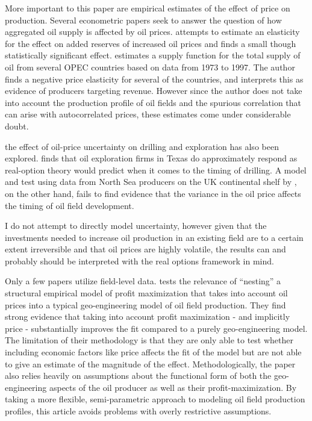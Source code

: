 \documentclass[12pt]{article}
\begin{document}
More important to this paper are empirical estimates of the effect of price on production. Several econometric papers seek to answer the question of how aggregated oil supply is affected by oil prices.  \citet{farzin_impact_2001} attempts to estimate an elasticity for the effect on added reserves of increased oil prices and finds a small though statistically significant effect.  \citet{ramcharran_oil_2002} estimates a supply function for the total supply of oil from several OPEC countries based on data from 1973 to 1997.  The author finds a negative price elasticity for several of the countries, and interprets this as evidence of producers targeting revenue.  However since the author does not take into account the production profile of oil fields and the spurious correlation that can arise with autocorrelated prices, these estimates come under considerable doubt.  

the effect of oil-price uncertainty on drilling and exploration has also been explored.  \citet{kellogg_effect_2014} finds that oil exploration firms in Texas do approximately respond as real-option theory would predict when it comes to the timing of drilling.  A model and test using data from North Sea producers on the UK continental shelf by \citet{hurn_geology_1994}, on the other hand, fails to find evidence that the variance in the oil price affects the timing of oil field development.  

I do not attempt to directly model uncertainty, however given that the investments needed to increase oil production in an existing field are to a certain extent irreversible and that oil prices are highly volatile, the results can and probably should be interpreted with the real options framework in mind.  

Only a few papers utilize field-level data.  \citet{black_is_1998} tests the relevance of “nesting” a structural empirical model of profit maximization that takes into account oil prices into a typical geo-engineering model of oil field production.  They find strong evidence that taking into account profit maximization - and implicitly price - substantially improves the fit compared to a purely geo-engineering model.   The limitation of their methodology is that they are only able to test whether including economic factors like price affects the fit of the model but are not able to give an estimate of the magnitude of the effect.  Methodologically, the paper also relies heavily on assumptions about the functional form of both the geo-engineering aspects of the oil producer as well as their profit-maximization.  By taking a more flexible, semi-parametric approach to modeling oil field production profiles, this article avoids problems with overly restrictive assumptions. 
\end{document}
